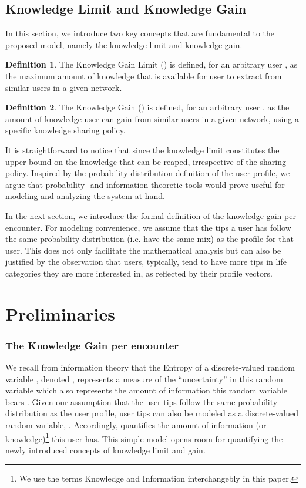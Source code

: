 \documentclass[conference]{IEEEtran}
\theoremstyle{definition}
\newtheorem{defn}{Definition}[section]
\begin{document}
\vspace{-0.2 cm}
\subsection{Knowledge Limit and Knowledge Gain}
In this section, we introduce two key concepts that are fundamental to the proposed model, namely the knowledge limit and knowledge gain.
\begin{defn}
The Knowledge Gain Limit () is defined, for an arbitrary user , as the maximum amount of knowledge that is available for user  to extract from similar users in a given network.
\end{defn}
\begin{defn}
The Knowledge Gain () is defined, for an arbitrary user , as the amount of knowledge user  can gain from similar users in a given network, using a specific knowledge sharing policy.
\end{defn}
\vspace{-0.2 cm}
It is straightforward to notice that  since the knowledge limit constitutes the upper bound on the knowledge that can be reaped, irrespective of the sharing policy. Inspired by the probability distribution definition of the user profile, we argue that probability- and information-theoretic tools would prove useful for modeling and analyzing the system at hand.

In the next section, we introduce the formal definition of the knowledge gain per encounter. For modeling convenience, we assume that the tips a user has follow the same probability distribution  (i.e. have the same mix) as the profile for that user. This does not only facilitate the mathematical analysis but can also be justified by the observation that users, typically, tend to have more tips in life categories they are more interested in, as reflected by their profile vectors.


\vspace{-0.1 cm}
\section{Preliminaries}
\subsubsection{The Knowledge Gain per encounter}

We recall from information theory that the Entropy of a discrete-valued random variable , denoted , represents a measure of the ``uncertainty'' in this random variable which also represents the amount of information this random variable bears \cite{cover}. Given our assumption that the user tips follow the same probability distribution as the user profile, user tips can also be modeled as a discrete-valued random variable, . Accordingly,  
quantifies the amount of information (or knowledge)\footnote{We use the terms Knowledge and Information interchangebly in this paper.} this user has. This simple model opens room for quantifying the newly introduced concepts of knowledge limit and gain.
\end{document}
